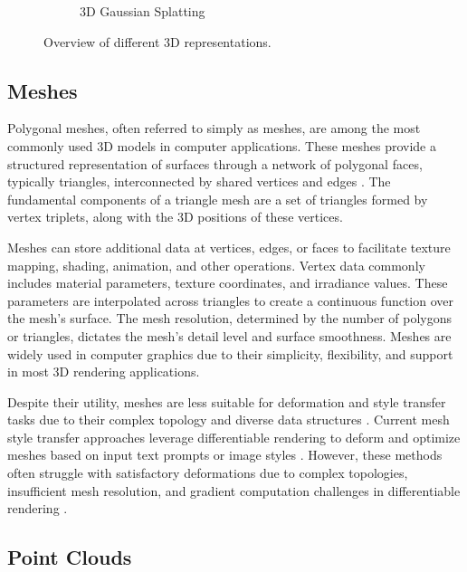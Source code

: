\begin{figure}
\begin{subfigure}{0.48\linewidth}
        \caption{3D Gaussian Splatting}
    \end{subfigure}
    \caption{Overview of different 3D representations.}
    \label{fig:3D_representation}
\end{figure}

\subsection{Meshes}

Polygonal meshes, often referred to simply as meshes, are among the most commonly used 3D models in computer applications. These meshes provide a structured representation of surfaces through a network of polygonal faces, typically triangles, interconnected by shared vertices and edges \citep{Shirley.2002}. The fundamental components of a triangle mesh are a set of triangles formed by vertex triplets, along with the 3D positions of these vertices.

Meshes can store additional data at vertices, edges, or faces to facilitate texture mapping, shading, animation, and other operations. Vertex data commonly includes material parameters, texture coordinates, and irradiance values. These parameters are interpolated across triangles to create a continuous function over the mesh's surface. The mesh resolution, determined by the number of polygons or triangles, dictates the mesh's detail level and surface smoothness. Meshes are widely used in computer graphics due to their simplicity, flexibility, and support in most 3D rendering applications.

Despite their utility, meshes are less suitable for deformation and style transfer tasks due to their complex topology and diverse data structures \citep{Kang.2023}. Current mesh style transfer approaches leverage differentiable rendering \citep{Kato.2018} to deform and optimize meshes based on input text prompts \citep{Michel.2021} or image styles \citep{Gao.2022}. However, these methods often struggle with satisfactory deformations due to complex topologies, insufficient mesh resolution, and gradient computation challenges in differentiable rendering \citep{Kato.2020}.


\subsection{Point Clouds}


